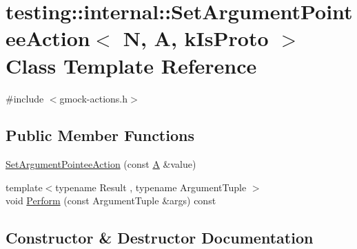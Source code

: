 \hypertarget{classtesting_1_1internal_1_1_set_argument_pointee_action}{}\section{testing\+:\+:internal\+:\+:Set\+Argument\+Pointee\+Action$<$ N, A, k\+Is\+Proto $>$ Class Template Reference}
\label{classtesting_1_1internal_1_1_set_argument_pointee_action}


{\ttfamily \#include $<$gmock-\/actions.\+h$>$}

\subsection*{Public Member Functions}
\begin{DoxyCompactItemize}
\item 
\hyperlink{classtesting_1_1internal_1_1_set_argument_pointee_action_a5a4119ed113667bd4a003ab0bec2cdff}{Set\+Argument\+Pointee\+Action} (const \hyperlink{namespacetesting_a5e9134d655d2fc9323902348083282e7}{A} \&value)
\item 
{\footnotesize template$<$typename Result , typename Argument\+Tuple $>$ }\\void \hyperlink{classtesting_1_1internal_1_1_set_argument_pointee_action_a128320dcf991ff7f1a0087dab38b4014}{Perform} (const Argument\+Tuple \&args) const
\end{DoxyCompactItemize}


\subsection{Constructor \& Destructor Documentation}
\mbox{\label{classtesting_1_1internal_1_1_set_argument_pointee_action_a5a4119ed113667bd4a003ab0bec2cdff}} 

